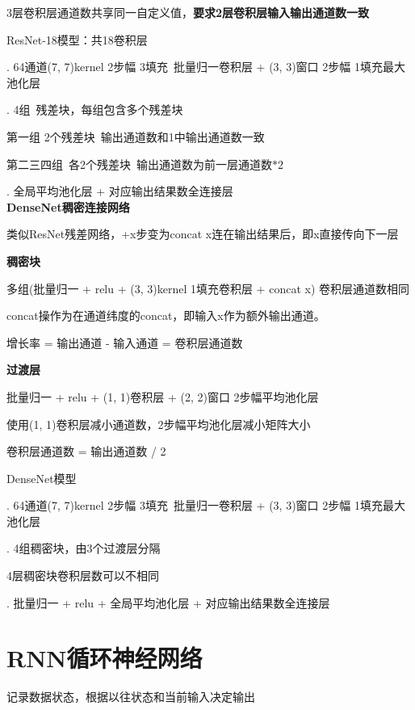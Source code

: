 \documentclass[UTF8]{ctexart}
\begin{document}
  \quad \quad 3层卷积层通道数共享同一自定义值，\textbf{要求2层卷积层输入输出通道数一致}

  ResNet-18模型：共18卷积层

  . 64通道(7, 7)kernel 2步幅 3填充\ 批量归一卷积层 + (3, 3)窗口 2步幅 1填充最大池化层

  . 4组\ 残差块，每组包含多个残差块

  \quad \quad 第一组 2个残差块\ 输出通道数和1中输出通道数一致
  
  \quad \quad 第二三四组\ 各2个残差块\ 输出通道数为前一层通道数$*2$

  . 全局平均池化层 + 对应输出结果数全连接层\\
\textbf{DenseNet稠密连接网络}

  类似ResNet残差网络，+x步变为concat x连在输出结果后，即x直接传向下一层

  \textbf{稠密块}

  \quad 多组(批量归一 + relu + (3, 3)kernel 1填充卷积层 + concat x) 卷积层通道数相同

  \quad concat操作为在通道纬度的concat，即输入x作为额外输出通道。

  \quad 增长率 = 输出通道 - 输入通道 = 卷积层通道数

  \textbf{过渡层}

  \quad 批量归一 + relu + (1, 1)卷积层 + (2, 2)窗口 2步幅平均池化层
  
  \quad 使用(1, 1)卷积层减小通道数，2步幅平均池化层减小矩阵大小

  \quad \quad 卷积层通道数 = 输出通道数 / 2

  DenseNet模型

  . 64通道(7, 7)kernel 2步幅 3填充\ 批量归一卷积层 + (3, 3)窗口 2步幅 1填充最大池化层

  . 4组稠密块，由3个过渡层分隔

  \quad \quad 4层稠密块卷积层数可以不相同

  . 批量归一 + relu + 全局平均池化层 + 对应输出结果数全连接层

\section{RNN循环神经网络}

\noindent 记录数据状态，根据以往状态和当前输入决定输出
\end{document}
